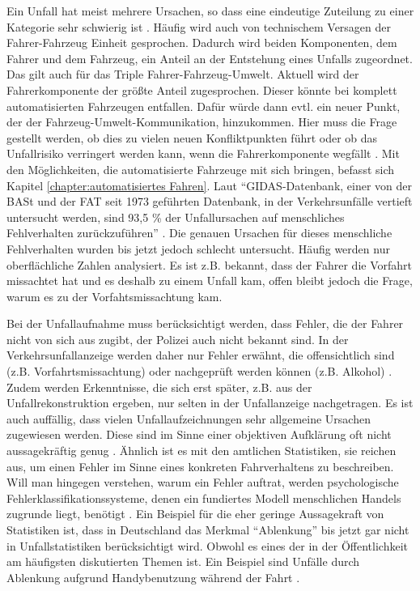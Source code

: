 Ein Unfall hat meist mehrere Ursachen, so dass eine eindeutige Zuteilung zu einer Kategorie sehr schwierig ist \parencite[S. 78]{Grundl.2005}. Häufig wird auch von technischem Versagen der Fahrer-Fahrzeug Einheit gesprochen. Dadurch wird beiden Komponenten, dem Fahrer und dem Fahrzeug, ein Anteil an der Entstehung eines Unfalls zugeordnet. Das gilt auch für das Triple Fahrer-Fahrzeug-Umwelt. Aktuell wird der Fahrerkomponente der größte Anteil zugesprochen. Dieser könnte bei komplett automatisierten Fahrzeugen entfallen. Dafür würde dann evtl. ein neuer Punkt, der der Fahrzeug-Umwelt-Kommunikation, hinzukommen. Hier muss die Frage gestellt werden, ob dies zu vielen neuen Konfliktpunkten führt oder ob das Unfallrisiko verringert werden kann, wenn die Fahrerkomponente wegfällt \parencite[S. 70]{Bock.1989}. Mit den Möglichkeiten, die automatisierte Fahrzeuge mit sich bringen, befasst sich Kapitel \ref{chapter:automatisiertes Fahren}. Laut \enquote{\ac{GIDAS}-Datenbank, einer von der \ac{BASt} und der \ac{FAT} seit 1973 geführten Datenbank, in der Verkehrsunfälle vertieft untersucht werden, sind 93,5 \% der Unfallursachen auf menschliches Fehlverhalten zurückzuführen} \parencite[S. 10]{Grundl.2005}. Die genauen Ursachen für dieses menschliche Fehlverhalten wurden bis jetzt jedoch schlecht untersucht. Häufig werden nur oberflächliche Zahlen analysiert. Es ist z.B. bekannt, dass der Fahrer die Vorfahrt missachtet hat und es deshalb zu einem Unfall kam, offen bleibt jedoch die Frage, warum es zu der Vorfahtsmissachtung kam.

Bei der Unfallaufnahme muss berücksichtigt werden, dass Fehler, die der Fahrer nicht von sich aus zugibt, der Polizei auch nicht bekannt sind. In der Verkehrsunfallanzeige werden daher nur Fehler erwähnt, die offensichtlich sind (z.B. Vorfahrtsmissachtung) oder nachgeprüft werden können (z.B. Alkohol) \parencite[S. 27]{Grundl.2005}. Zudem werden Erkenntnisse, die sich erst später, z.B. aus der Unfallrekonstruktion ergeben, nur selten in der Unfallanzeige nachgetragen. Es ist auch auffällig, dass vielen Unfallaufzeichnungen sehr allgemeine Ursachen zugewiesen werden. Diese sind im Sinne einer objektiven Aufklärung oft nicht aussagekräftig genug \parencite[S. 11]{DEKRA.2017}. Ähnlich ist es mit den amtlichen Statistiken, sie reichen aus, um einen Fehler im Sinne eines konkreten Fahrverhaltens zu beschreiben. Will man hingegen verstehen, warum ein Fehler auftrat, werden psychologische Fehlerklassifikationssysteme, denen ein fundiertes Modell menschlichen Handels zugrunde liegt, benötigt \parencite[S. 79]{Grundl.2005}. Ein Beispiel für die eher geringe Aussagekraft von Statistiken ist, dass in Deutschland das Merkmal \enquote{Ablenkung} bis jetzt gar nicht in Unfallstatistiken berücksichtigt wird. Obwohl es eines der in der Öffentlichkeit am häufigsten diskutierten Themen ist. Ein Beispiel sind Unfälle durch Ablenkung aufgrund Handybenutzung während der Fahrt \parencite[S. 42]{DEKRA.2017}.

